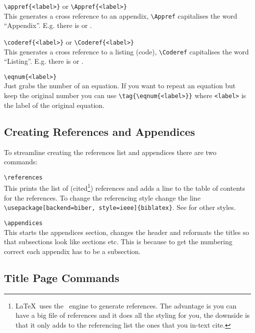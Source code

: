 \documentclass[a4paper, 12pt, english]{article}
\begin{document}
            \verb+\appref{<label>}+ or \verb+\Appref{<label>}+\\
            This generates a cross reference to an appendix, \verb+\Appref+ capitalises the word ``Appendix''. E.g. there is  or .

            \verb+\coderef{<label>}+ or \verb+\Coderef{<label>}+\\
            This generates a cross reference to a listing (code), \verb+\Coderef+ capitalises the word ``Listing''. E.g. there is  or .

            \verb+\eqnum{<label>}+\\
            Just grabs the number of an equation. If you want to repeat an equation but keep the original number you can use \verb+\tag{\eqnum{<label>}}+ where \verb+<label>+ is the label of the original equation.

        \newpage

        \subsection{Creating References and Appendices}
            \label{subsec: creating references and appendices}

            To streamline creating the references list and appendices there are two commands:

            \verb+\references+\\
            This prints the list of (cited\footnote{\LaTeX~uses the \BibTeX~engine to generate references. The advantage is you can have a big file of references and it does all the styling for you, the downside is that it only adds to the referencing list the ones that you in-text cite.}) references and adds a line to the table of contents for the references. To change the referencing style change the line \\\verb+\usepackage[backend=biber, style=ieee]{biblatex}+. See \textcite{referencing-styles} for other styles.

            \verb+\appendices+\\
            This starts the appendices section, changes the header and reformats the titles so that subsections look like sections etc. This is because to get the numbering correct each appendix has to be a subsection.


        \subsection{Title Page Commands}
            \label{subsec: title page commands}
\end{document}
